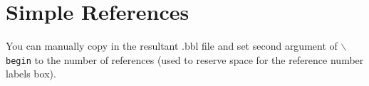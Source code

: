 \documentclass[lettersize,journal]{IEEEtran}
\begin{document}



%
%
%
\section{Simple References}
You can manually copy in the resultant .bbl file and set second argument of $\backslash${\tt{begin}} to the number of references
 (used to reserve space for the reference number labels box).
\end{document}
